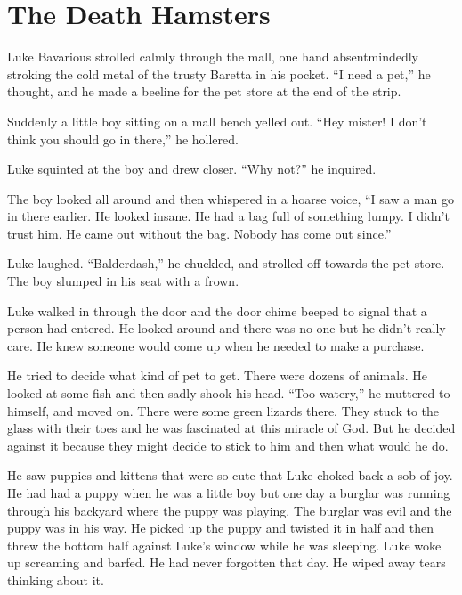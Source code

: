 \chapter{The Death Hamsters}





Luke Bavarious strolled calmly through the mall, one hand
absentmindedly stroking the cold metal of the trusty Baretta in his
pocket. ``I need a pet,'' he thought, and he made a beeline for the
pet store at the end of the strip.



Suddenly a little boy sitting on a mall bench yelled out. ``Hey
mister! I don't think you should go in there,'' he hollered.



Luke squinted at the boy and drew closer. ``Why not?'' he
inquired.



The boy looked all around and then whispered in a hoarse voice, ``I
saw a man go in there earlier. He looked insane. He had a bag full
of something lumpy. I didn't trust him. He came out without the
bag. Nobody has come out since.''



Luke laughed. ``Balderdash,'' he chuckled, and strolled off towards
the pet store. The boy slumped in his seat with a frown.



Luke walked in through the door and the door chime beeped to signal
that a person had entered. He looked around and there was no one
but he didn't really care. He knew someone would come up when he
needed to make a purchase.



He tried to decide what kind of pet to get. There were dozens of
animals. He looked at some fish and then sadly shook his head. ``Too
watery,'' he muttered to himself, and moved on. There were some
green lizards there. They stuck to the glass with their toes and he
was fascinated at this miracle of God. But he decided against it
because they might decide to stick to him and then what would he
do.



He saw puppies and kittens that were so cute that Luke choked back
a sob of joy. He had had a puppy when he was a little boy but one
day a burglar was running through his backyard where the puppy was
playing. The burglar was evil and the puppy was in his way. He
picked up the puppy and twisted it in half and then threw the
bottom half against Luke's window while he was sleeping. Luke woke
up screaming and barfed. He had never forgotten that day. He wiped
away tears thinking about it.



